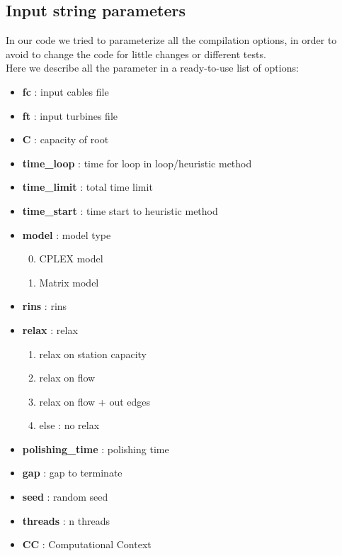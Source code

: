 \begin{appendices}
\chapter{Input string parameters}
In our code we tried to parameterize all the compilation options, in order to avoid to change the code for little changes or different tests. \\
Here we describe all the parameter in a ready-to-use list of options: 
\begin{itemize}
\setlength{\parskip}{0pt}
\setlength{\itemsep}{0.5pt plus 1pt}
\item \textbf{fc} : input cables file
\item \textbf{ft} : input turbines file
\item \textbf{C} : capacity of root
\item \textbf{time\_loop} : time for loop in loop/heuristic method
\item \textbf{time\_limit} : total time limit
\item \textbf{time\_start} : time start to heuristic method
\item \textbf{model} : model type
\begin{enumerate}\setcounter{enumi}{-1}
\setlength{\parskip}{0pt}
\setlength{\itemsep}{0pt plus 1pt}
	\item \textsc{CPLEX} model
	\item Matrix model
\end{enumerate}
\item \textbf{rins} : rins
\item \textbf{relax} : relax
\begin{enumerate}\setcounter{enumi}{0}
\setlength{\parskip}{0pt}
\setlength{\itemsep}{0pt plus 1pt}
	\item relax on station capacity
	\item relax on flow
	\item relax on flow + out edges
	\item[] else : no relax
\end{enumerate}
\item \textbf{polishing\_time} : polishing time
\item \textbf{gap} : gap to terminate
\item \textbf{seed} : random seed
\item \textbf{threads} : n threads
\item \textbf{CC} : Computational Context
\begin{enumerate}\setcounter{enumi}{-1}
\setlength{\parskip}{0pt}

\end{enumerate}
\end{itemize}
\end{appendices}
